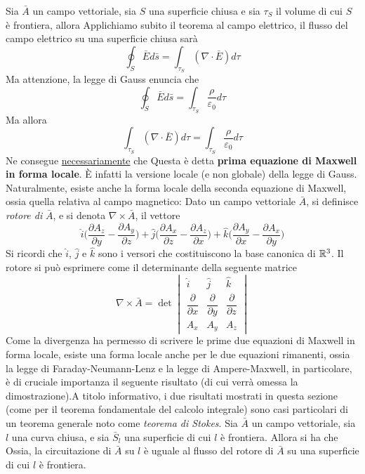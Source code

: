 \documentclass[10pt, letterpaper]{report}
\begin{document}
 Sia $\bar A$ un campo vettoriale, sia $S$ una superficie chiusa e sia $\tau_S$ il volume di cui $S$ è frontiera, allora
Applichiamo subito il teorema al campo elettrico, il flusso del campo elettrico su una superficie chiusa sarà 
$$\oint_S \bar E d\bar s =\int_{\tau_S}(\nabla \cdot \bar E)d\tau $$
Ma attenzione, la legge di Gauss enuncia che 
$$\oint_S \bar E d\bar s =\int_{\tau_S}\frac{\rho}{\varepsilon_0}d\tau $$
Ma allora 
$$\int_{\tau_S}(\nabla \cdot \bar E)d\tau=\int_{\tau_S}\frac{\rho}{\varepsilon_0}d\tau $$
Ne consegue \underline{necessariamente} che 
Questa è detta \textbf{prima equazione di Maxwell in forma locale}. È infatti la versione locale (e non globale) della legge di Gauss. Naturalmente, esiste anche la forma locale della seconda equazione di Maxwell, ossia quella relativa al campo magnetico:
 Dato un campo vettoriale $\bar A$, si definisce \textit{rotore di } $\bar A$, e si denota $\nabla \times \bar A $, il vettore 
$$\hat i\Big(\frac{\partial A_z}{\partial y}-\frac{\partial A_y}{\partial z}\Big)+
\hat j\Big(\frac{\partial A_x}{\partial z}-\frac{\partial A_z}{\partial x}\Big)+
\hat k\Big(\frac{\partial A_y}{\partial x}-\frac{\partial A_x}{\partial y}\Big) $$
Si ricordi che $\hat i$, $\hat j$ e $\hat k$ sono i versori che costituiscono la base canonica di ${\mathbb R}^3$. Il rotore si può esprimere come il determinante della seguente matrice 
$$\nabla \times \bar A=\det\begin{vmatrix}
    \hat i & \hat j & \hat k \\ 
    \dfrac{\partial}{\partial x} &  \dfrac{\partial}{\partial y} &  \dfrac{\partial}{\partial z} \\ 
    A_x & A_y & A_z
\end{vmatrix} $$
Come la divergenza ha permesso di scrivere le prime due equazioni di Maxwell in forma locale, esiste una forma locale anche per le due equazioni rimanenti, ossia la legge di Faraday-Neumann-Lenz e la legge di Ampere-Maxwell, in particolare, è di cruciale importanza il seguente risultato (di cui verrà omessa la dimostrazione).\acc  A titolo informativo, i due risultati mostrati in questa sezione (come per il teorema fondamentale del calcolo integrale) sono casi particolari di un teorema generale noto come \textit{teorema di Stokes}.\acc
{} Sia $\bar A$ un campo vettoriale, sia $l$ una curva chiusa, e sia $\bar S_l$ una superficie di cui $l$ è frontiera. Allora si ha che 
Ossia, la circuitazione di $\bar A$ su $l$ è uguale al flusso del rotore di $\bar A$ su una superficie di cui $l$ è frontiera. 
\end{document}
